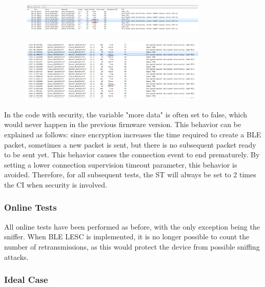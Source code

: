 \documentclass{Configuration_Files/PoliMi3i_thesis}
\begin{document}
\begin{figure}[H]
    \centering
    \includegraphics[width=0.8\textwidth]{Results Manuel/figure10}
    \label{fig:figure1}
\end{figure}

\begin{figure}[H]
    \centering
    \includegraphics[width=0.8\textwidth]{Results Manuel/figure11}
    \label{fig:figure1}
\end{figure}

In the code with security, the variable "more data" is often set to false, which would never happen in the previous firmware version. This behavior can be explained as follows: since encryption increases the time required to create a BLE packet, sometimes a new packet is sent, but there is no subsequent packet ready to be sent yet. This behavior causes the connection event to end prematurely. By setting a lower connection supervision timeout parameter, this behavior is avoided. Therefore, for all subsequent tests, the ST will always be set to 2 times the CI when security is involved.

\subsubsection*{Online Tests}

All online tests have been performed as before, with the only exception being the sniffer. When BLE LESC is implemented, it is no longer possible to count the number of retransmissions, as this would protect the device from possible sniffing attacks.

\subsubsection*{Ideal Case}
\end{document}
